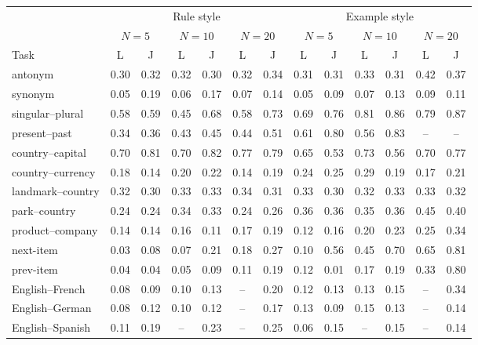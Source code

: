 \begin{tabular}{@{}lcccccccccccc@{}}
\toprule
 & \multicolumn{6}{c}{Rule style} & \multicolumn{6}{c}{Example style} \\
\cmidrule(lr){2-7}\cmidrule(lr){8-13}
 & \multicolumn{2}{c}{$N=5$} & \multicolumn{2}{c}{$N=10$} & \multicolumn{2}{c}{$N=20$} & \multicolumn{2}{c}{$N=5$} & \multicolumn{2}{c}{$N=10$} & \multicolumn{2}{c}{$N=20$} \\
\cmidrule(lr){2-3}\cmidrule(lr){4-5}\cmidrule(lr){6-7}\cmidrule(lr){8-9}\cmidrule(lr){10-11}\cmidrule(lr){12-13}
Task & L & J & L & J & L & J & L & J & L & J & L & J \\
\midrule
antonym & 0.30 & 0.32 & 0.32 & 0.30 & 0.32 & 0.34 & 0.31 & 0.31 & 0.33 & 0.31 & 0.42 & 0.37 \\
synonym & 0.05 & 0.19 & 0.06 & 0.17 & 0.07 & 0.14 & 0.05 & 0.09 & 0.07 & 0.13 & 0.09 & 0.11 \\
singular--plural & 0.58 & 0.59 & 0.45 & 0.68 & 0.58 & 0.73 & 0.69 & 0.76 & 0.81 & 0.86 & 0.79 & 0.87 \\
present--past & 0.34 & 0.36 & 0.43 & 0.45 & 0.44 & 0.51 & 0.61 & 0.80 & 0.56 & 0.83 & -- & -- \\
country--capital & 0.70 & 0.81 & 0.70 & 0.82 & 0.77 & 0.79 & 0.65 & 0.53 & 0.73 & 0.56 & 0.70 & 0.77 \\
country--currency & 0.18 & 0.14 & 0.20 & 0.22 & 0.14 & 0.19 & 0.24 & 0.25 & 0.29 & 0.19 & 0.17 & 0.21 \\
landmark--country & 0.32 & 0.30 & 0.33 & 0.33 & 0.34 & 0.31 & 0.33 & 0.30 & 0.32 & 0.33 & 0.33 & 0.32 \\
park--country & 0.24 & 0.24 & 0.34 & 0.33 & 0.24 & 0.26 & 0.36 & 0.36 & 0.35 & 0.36 & 0.45 & 0.40 \\
product--company & 0.14 & 0.14 & 0.16 & 0.11 & 0.17 & 0.19 & 0.12 & 0.16 & 0.20 & 0.23 & 0.25 & 0.34 \\
next-item & 0.03 & 0.08 & 0.07 & 0.21 & 0.18 & 0.27 & 0.10 & 0.56 & 0.45 & 0.70 & 0.65 & 0.81 \\
prev-item & 0.04 & 0.04 & 0.05 & 0.09 & 0.11 & 0.19 & 0.12 & 0.01 & 0.17 & 0.19 & 0.33 & 0.80 \\
English--French & 0.08 & 0.09 & 0.10 & 0.13 & -- & 0.20 & 0.12 & 0.13 & 0.13 & 0.15 & -- & 0.34 \\
English--German & 0.08 & 0.12 & 0.10 & 0.12 & -- & 0.17 & 0.13 & 0.09 & 0.15 & 0.13 & -- & 0.14 \\
English--Spanish & 0.11 & 0.19 & -- & 0.23 & -- & 0.25 & 0.06 & 0.15 & -- & 0.15 & -- & 0.14 \\
\bottomrule
\end{tabular}
